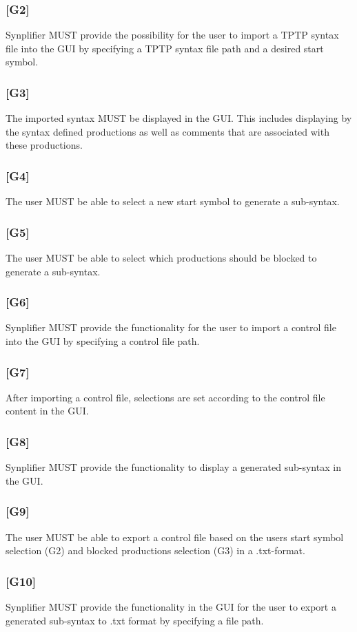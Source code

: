 \subsubsection{[G2]}\label{G2}
\ac{Synplifier} MUST provide the possibility for the user to import a \ac{TPTP} syntax file into the GUI by specifying a \ac{TPTP} syntax file path and a desired start symbol. 
\subsubsection{[G3]}\label{G3}
The imported syntax MUST be displayed in the GUI. This includes displaying by the syntax defined productions as well as comments that are associated with these productions.
\subsubsection{[G4]}\label{G4}
The user MUST be able to select a new start symbol to generate a sub-syntax.
\subsubsection{[G5]}\label{G5}
The user MUST be able to select which productions should be blocked to generate a sub-syntax.
\subsubsection{[G6]}\label{G9}
\ac{Synplifier} MUST provide the functionality for the user to import a control file into the GUI by specifying a control file path. 
\subsubsection{[G7]}\label{G7}
After importing a control file, selections are set according to the control file content in the GUI.
\subsubsection{[G8]}\label{G8}
\ac{Synplifier} MUST provide the functionality to display a generated sub-syntax in the GUI.
\subsubsection{[G9]}\label{G9}
The user MUST be able to export a control file based on the users start symbol selection (G2) and blocked productions selection (G3) in a .txt-format.
\subsubsection{[G10]}\label{G10}
\ac{Synplifier} MUST provide the functionality in the GUI for the user to export a generated sub-syntax to .txt format by specifying a file path.
